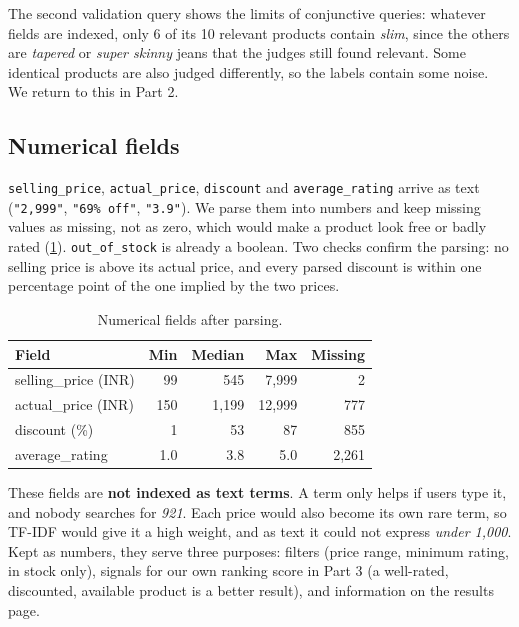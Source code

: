\documentclass[11pt,a4paper]{article}
\begin{document}
The second validation query shows the limits of conjunctive queries: whatever fields
are indexed, only 6 of its 10 relevant products contain \emph{slim}, since the
others are \emph{tapered} or \emph{super skinny} jeans that the judges still found
relevant. Some identical products are also judged differently, so the labels contain
some noise. We return to this in Part 2.

\subsection{Numerical fields}

\texttt{selling\_price}, \texttt{actual\_price}, \texttt{discount} and
\texttt{average\_rating} arrive as text (\texttt{"2,999"}, \texttt{"69\% off"},
\texttt{"3.9"}). We parse them into numbers and keep missing values as missing, not
as zero, which would make a product look free or badly rated
(\cref{tab:numeric}). \texttt{out\_of\_stock} is already a boolean. Two checks confirm the parsing: no selling price is above its actual
price, and every parsed discount is within one percentage point of the one implied by
the two prices.

\begin{table}[htbp]
  \centering
  \begin{tabular}{lrrrr}
    \toprule
    Field & Min & Median & Max & Missing \\
    \midrule
    selling\_price (INR) & 99 & 545 & 7{,}999 & 2 \\
    actual\_price (INR) & 150 & 1{,}199 & 12{,}999 & 777 \\
    discount (\%) & 1 & 53 & 87 & 855 \\
    average\_rating & 1.0 & 3.8 & 5.0 & 2{,}261 \\
    \bottomrule
  \end{tabular}
  \caption{Numerical fields after parsing.}
  \label{tab:numeric}
\end{table}

These fields are \textbf{not indexed as text terms}. A term only helps if users type
it, and nobody searches for \emph{921}. Each price would also become its own rare
term, so TF-IDF would give it a high weight, and as text it could not express
\emph{under 1{,}000}. Kept as numbers, they serve three purposes: filters (price range,
minimum rating, in stock only), signals for our own ranking score in Part 3 (a
well-rated, discounted, available product is a better result), and information on the
results page.
\end{document}
